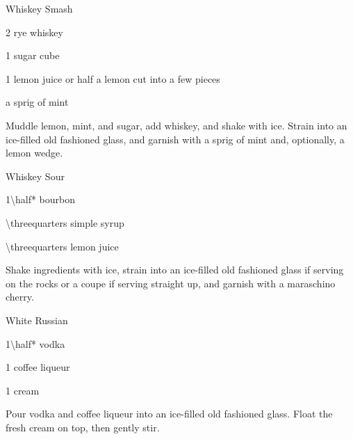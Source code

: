 \begin{Cocktail}{Whiskey Smash}
  \begin{Ingredients}
  \item \SI{2}{\oz} rye whiskey
  \item 1 sugar cube
  \item \SI{1}{\oz} lemon juice or half a lemon cut into a few pieces
  \item a sprig of mint
  \end{Ingredients}
  
  \begin{Instructions}
	Muddle lemon, mint, and sugar, add whiskey, and shake with ice.  Strain into an ice-filled old fashioned glass, and garnish with a sprig of mint and, optionally, a lemon wedge.
  \end{Instructions}
\end{Cocktail}

\begin{Cocktail}{Whiskey Sour}
  \begin{Ingredients}
  \item \SI{1\half*}{\oz} bourbon
  \item \SI{\threequarters}{\oz} simple syrup
  \item \SI{\threequarters}{\oz} lemon juice
  \end{Ingredients}
  
  \begin{Instructions}
	Shake ingredients with ice, strain into an ice-filled old fashioned glass
    if serving on the rocks or a coupe if serving straight up, and garnish with
    a maraschino cherry. 
  \end{Instructions}
\end{Cocktail}

\begin{Cocktail}{White Russian}
  \begin{Ingredients}
  \item \SI{1\half*}{\oz} vodka
  \item \SI{1}{\oz} coffee liqueur
  \item \SI{1}{\oz} cream
  \end{Ingredients}
  
  \begin{Instructions}
	Pour vodka and coffee liqueur into an ice-filled old fashioned glass.
    Float the fresh cream on top, then gently stir.
  \end{Instructions}
\end{Cocktail}

